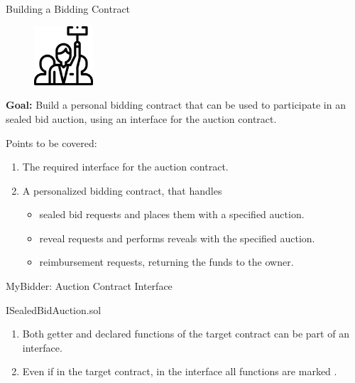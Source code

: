 \documentclass[]{beamer}
\begin{document}
\begin{frame}{Building a Bidding Contract}

\begin{minipage}{0.3\textwidth}
	\begin{figure}
		\center
		\includegraphics[width= 2.2cm]{../assets/images/bidder.png}	
	\end{figure}
\end{minipage}
\begin{minipage}{0.65\textwidth}
	\vspace{0.5em}
	\textbf{Goal:} Build a personal bidding contract that can be used to participate in an sealed bid auction, using an interface for the auction contract.\\
\end{minipage}

\vspace{2em}

Points to be covered:
\vspace{0.5em}
\begin{enumerate}
	\item	The required interface for the auction contract.
	\item	A personalized bidding contract, that handles
	\vspace{0.5em}
	\begin{itemize}
		\item sealed bid requests and places them with a specified auction.
		\item reveal requests and performs reveals with the specified auction.
		\item reimbursement requests, returning the funds to the owner.
	\end{itemize}
\end{enumerate}


\end{frame}


\begin{frame}{MyBidder: Auction Contract Interface}

\begin{samplecode}{ISealedBidAuction.sol}
	
\end{samplecode}
\begin{enumerate}
	\item	Both getter and declared functions of the target contract can be part of an interface.
	\item	Even if  in the target contract, in the interface all functions are marked .
\end{enumerate}

\end{frame}
\end{document}
